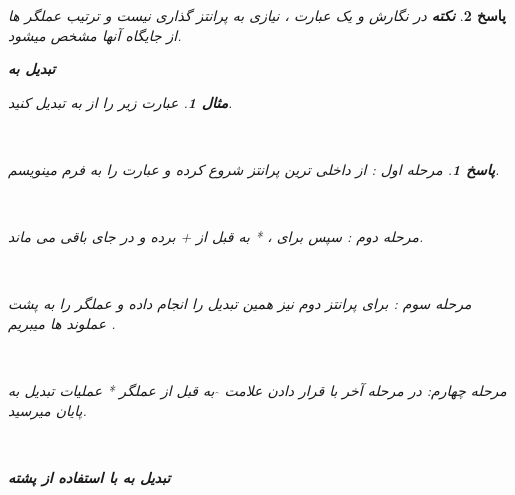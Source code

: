 \documentclass[12pt]{article}
\newtheorem{question}{مثال}[section]
\newtheorem{answer}{پاسخ}[section]
\newcommand{\infi}{\lr{infix}}
\begin{document}
\begin{answer}
\textbf{نکته} در نگارش  و 
یک عبارت ، نیازی به پرانتز گذاری نیست و ترتیب عملگر ها از جایگاه آنها مشخص میشود.\\

\newpage
\begin{center}
\textbf{تبدیل   به  }
\end{center}

\begin{question}
عبارت زیر را از  \; \infi \; به  تبدیل کنید.
\begin{center}
	\\
\end{center}
\end{question}
\begin{answer}

مرحله اول : از داخلی ترین پرانتز شروع کرده و عبارت  را به فرم  مینویسم.
\begin{center}
	\\
\end{center}
مرحله دوم : سپس برای  ، * به قبل از + برده و   در جای باقی می ماند.
\begin{center}
	\\
\end{center}
مرحله سوم : برای پرانتز دوم نیز همین تبدیل را انجام داده و عملگر را به پشت عملوند ها میبریم .
\begin{center}
	\\
\end{center}
مرحله چهارم: در مرحله آخر با قرار دادن علامت \; $\widehat{}$ \; به  قبل از عملگر * عملیات تبدیل به پایان میرسید.
\begin{center}
	\\
\end{center}
\newline
\end{answer}
\newline


\begin{center}
\textbf{ تبدیل \;\; به\;  \;با استفاده از پشته}\\
\end{center}


\end{answer}
\end{document}
